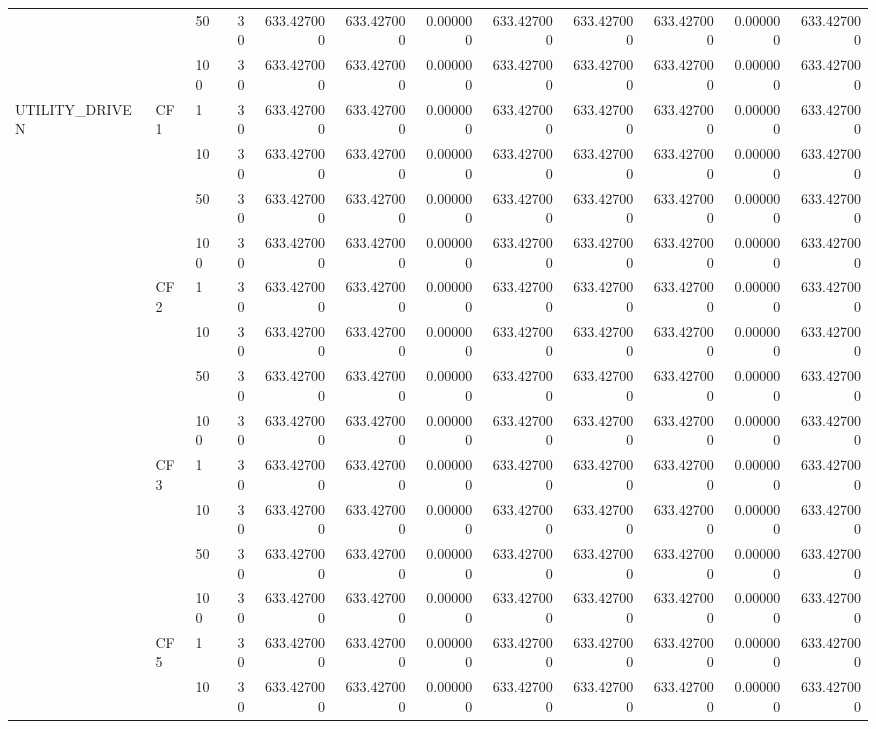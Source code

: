 \begin{tabular}{lllrrrrrrrrr}
 &  & 50 & 30 & 633.427000 & 633.427000 & 0.000000 & 633.427000 & 633.427000 & 633.427000 & 0.000000 & 633.427000 \\
 &  & 100 & 30 & 633.427000 & 633.427000 & 0.000000 & 633.427000 & 633.427000 & 633.427000 & 0.000000 & 633.427000 \\
\cline{1-12} \cline{2-12}
\multirow[t]{16}{*}{UTILITY_DRIVEN} & \multirow[t]{4}{*}{CF1} & 1 & 30 & 633.427000 & 633.427000 & 0.000000 & 633.427000 & 633.427000 & 633.427000 & 0.000000 & 633.427000 \\
 &  & 10 & 30 & 633.427000 & 633.427000 & 0.000000 & 633.427000 & 633.427000 & 633.427000 & 0.000000 & 633.427000 \\
 &  & 50 & 30 & 633.427000 & 633.427000 & 0.000000 & 633.427000 & 633.427000 & 633.427000 & 0.000000 & 633.427000 \\
 &  & 100 & 30 & 633.427000 & 633.427000 & 0.000000 & 633.427000 & 633.427000 & 633.427000 & 0.000000 & 633.427000 \\
\cline{2-12}
 & \multirow[t]{4}{*}{CF2} & 1 & 30 & 633.427000 & 633.427000 & 0.000000 & 633.427000 & 633.427000 & 633.427000 & 0.000000 & 633.427000 \\
 &  & 10 & 30 & 633.427000 & 633.427000 & 0.000000 & 633.427000 & 633.427000 & 633.427000 & 0.000000 & 633.427000 \\
 &  & 50 & 30 & 633.427000 & 633.427000 & 0.000000 & 633.427000 & 633.427000 & 633.427000 & 0.000000 & 633.427000 \\
 &  & 100 & 30 & 633.427000 & 633.427000 & 0.000000 & 633.427000 & 633.427000 & 633.427000 & 0.000000 & 633.427000 \\
\cline{2-12}
 & \multirow[t]{4}{*}{CF3} & 1 & 30 & 633.427000 & 633.427000 & 0.000000 & 633.427000 & 633.427000 & 633.427000 & 0.000000 & 633.427000 \\
 &  & 10 & 30 & 633.427000 & 633.427000 & 0.000000 & 633.427000 & 633.427000 & 633.427000 & 0.000000 & 633.427000 \\
 &  & 50 & 30 & 633.427000 & 633.427000 & 0.000000 & 633.427000 & 633.427000 & 633.427000 & 0.000000 & 633.427000 \\
 &  & 100 & 30 & 633.427000 & 633.427000 & 0.000000 & 633.427000 & 633.427000 & 633.427000 & 0.000000 & 633.427000 \\
\cline{2-12}
 & \multirow[t]{4}{*}{CF5} & 1 & 30 & 633.427000 & 633.427000 & 0.000000 & 633.427000 & 633.427000 & 633.427000 & 0.000000 & 633.427000 \\
 &  & 10 & 30 & 633.427000 & 633.427000 & 0.000000 & 633.427000 & 633.427000 & 633.427000 & 0.000000 & 633.427000 \\

\end{tabular}
